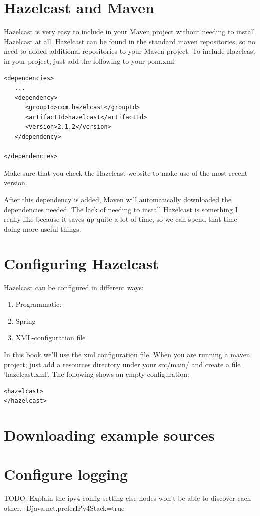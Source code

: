 \section{Hazelcast and Maven}

Hazelcast is very easy to include in your Maven project without needing to install Hazelcast at all. Hazelcast can be found in the standard maven repositories, so no need to added additional repositories to your Maven project. To include Hazelcast in your project, just add the following to your pom.xml:

\begin{verbatim}
<dependencies>	
   ...
   <dependency>
      <groupId>com.hazelcast</groupId>
      <artifactId>hazelcast</artifactId>
      <version>2.1.2</version>
   </dependency>

</dependencies>
\end{verbatim}	

Make sure that you check the Hazelcast website to make use of the most recent version. 

After this dependency is added, Maven will automatically downloaded the dependencies needed.  The lack of needing to install Hazelcast is something I really like because it saves up quite a lot of time, so we can spend that time doing more useful things.

\section{Configuring Hazelcast}
Hazelcast can be configured in different ways:
\begin{enumerate}
\item Programmatic:
\item Spring
\item XML-configuration file
\end{enumerate}
In this book we'll use the xml configuration file. When you are running a maven project; just add a resources directory under your src/main/ and create a file 'hazelcast.xml'. The following shows an empty configuration:
\begin{verbatim}
<hazelcast>
</hazelcast>
\end{verbatim}

\section{Downloading example sources}

\section{Configure logging}

TODO: Explain the ipv4 config setting else nodes won't be able to discover each other.
-Djava.net.preferIPv4Stack=true

